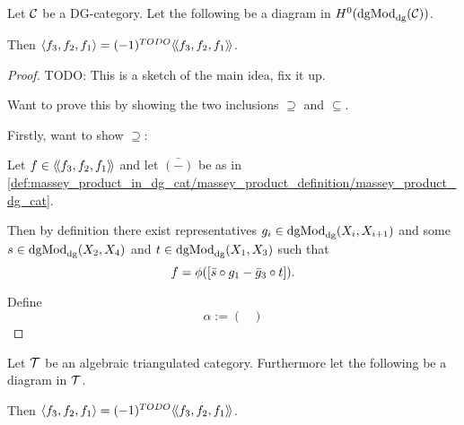 \begin{theorem}
    Let \( {\mathcal{C}} \) be a DG-category. Let the following be a diagram in \( H^0(\operatorname{dgMod}_{\operatorname{dg}}({\mathcal{C}})) \).
    \begin{center}
    \end{center}
    Then \( \langle f_3, f_2, f_1\rangle = (-1)^{TODO} \langle \! \langle f_3, f_2, f_1\rangle \! \rangle \).
\end{theorem}
\begin{proof}
    TODO: This is a sketch of the main idea, fix it up.

    Want to prove this by showing the two inclusions \( \supseteq \) and \( \subseteq \).

    Firstly, want to show \( \supseteq \):

    Let \( f \in \langle \! \langle f_3, f_2, f_1\rangle \! \rangle \) and let \( \bar{(-)} \) be as in \autoref{def:massey_product_in_dg_cat/massey_product_definition/massey_product_dg_cat}.
    
    Then by definition there exist representatives \( g_i \in \operatorname{dgMod}_{\operatorname{dg}}(X_i, X_{i + 1}) \) and some \( s \in \operatorname{dgMod}_{\operatorname{dg}}(X_2, X_4) \) and \( t \in \operatorname{dgMod}_{\operatorname{dg}}(X_1, X_3) \) such that
    \[
        f = \phi([\bar{s} \circ g_1 - \bar{g}_3 \circ t]).
    \]

    Define
    \[
        \alpha := 
        \begin{pmatrix}
            
        \end{pmatrix}
    \]

\end{proof}

\begin{corollary}
    Let \( {\mathcal{T}} \) be an algebraic triangulated category. Furthermore let the following be a diagram in \( {\mathcal{T}} \).
    \begin{center}
    \end{center}
    Then \( \langle f_3, f_2, f_1\rangle = (-1)^{TODO} \langle \! \langle f_3, f_2, f_1\rangle \! \rangle \).
\end{corollary}

